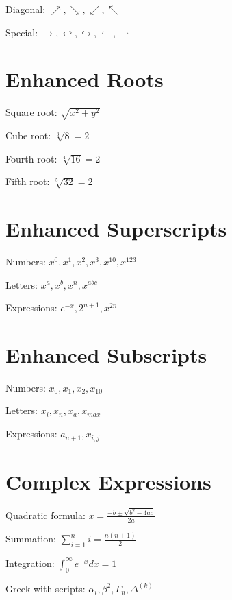 \documentclass{article}
\begin{document}
Diagonal: $\nearrow, \searrow, \swarrow, \nwarrow$

Special: $\mapsto, \hookleftarrow, \hookrightarrow, \leftharpoonup, \rightharpoonup$

\section{Enhanced Roots}

Square root: $\sqrt{x^2 + y^2}$

Cube root: $\sqrt[3]{8} = 2$

Fourth root: $\sqrt[4]{16} = 2$

Fifth root: $\sqrt[5]{32} = 2$

\section{Enhanced Superscripts}

Numbers: $x^0, x^1, x^2, x^3, x^{10}, x^{123}$

Letters: $x^a, x^b, x^n, x^{abc}$

Expressions: $e^{-x}, 2^{n+1}, x^{2n}$

\section{Enhanced Subscripts}

Numbers: $x_0, x_1, x_2, x_{10}$

Letters: $x_i, x_n, x_a, x_{max}$

Expressions: $a_{n+1}, x_{i,j}$

\section{Complex Expressions}

Quadratic formula: $x = \frac{-b \pm \sqrt{b^2 - 4ac}}{2a}$

Summation: $\sum_{i=1}^{n} i = \frac{n(n+1)}{2}$

Integration: $\int_0^\infty e^{-x} dx = 1$

Greek with scripts: $\alpha_i, \beta^2, \Gamma_n, \Delta^{(k)}$
\end{document}
